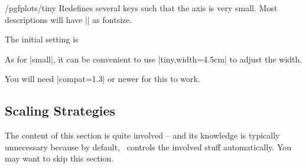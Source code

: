 \begin{stylekey}{/pgfplots/tiny}
	Redefines several keys such that the axis is very small. Most descriptions will have |\tiny| as fontsize.

\begin{codeexample}[]
\end{codeexample}
	The initial setting is
\begin{codeexample}
\end{codeexample}
As for |small|, it can be convenient to use |tiny,width=4.5cm| to adjust the width.

You will need |compat=1.3| or newer for this to work.
\end{stylekey}


\subsection{Scaling Strategies}
	The content of this section is quite involved -- and its knowledge is typically unnecessary because by default, \PGFPlots\ controls the involved stuff automatically. You may want to skip this section.

